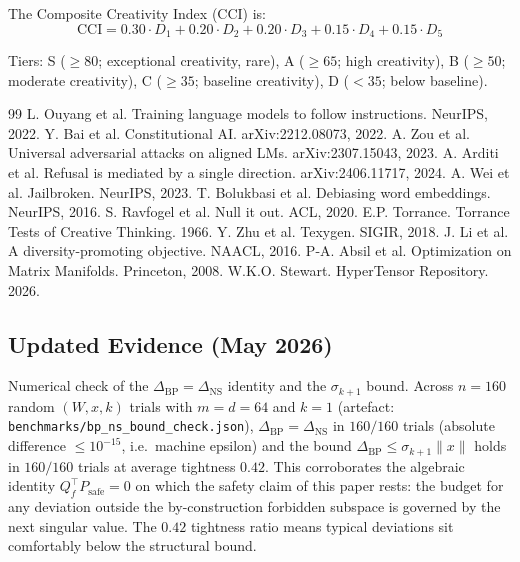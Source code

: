 \documentclass[11pt]{article}
\begin{document}
The Composite Creativity Index (CCI) is:
\begin{equation}
\mathrm{CCI} = 0.30 \cdot D_1 + 0.20 \cdot D_2 + 0.20 \cdot D_3 + 0.15 \cdot D_4 + 0.15 \cdot D_5
\end{equation}

Tiers: S ($\ge 80$; exceptional creativity, rare), A ($\ge 65$; high creativity), B ($\ge 50$; moderate creativity), C ($\ge 35$; baseline creativity), D ($<35$; below baseline).

\clearpage
\begin{thebibliography}{99}
 L. Ouyang et al. Training language models to follow instructions. NeurIPS, 2022.
 Y. Bai et al. Constitutional AI. arXiv:2212.08073, 2022.
 A. Zou et al. Universal adversarial attacks on aligned LMs. arXiv:2307.15043, 2023.
 A. Arditi et al. Refusal is mediated by a single direction. arXiv:2406.11717, 2024.
 A. Wei et al. Jailbroken. NeurIPS, 2023.
 T. Bolukbasi et al. Debiasing word embeddings. NeurIPS, 2016.
 S. Ravfogel et al. Null it out. ACL, 2020.
 E.P. Torrance. Torrance Tests of Creative Thinking. 1966.
 Y. Zhu et al. Texygen. SIGIR, 2018.
 J. Li et al. A diversity-promoting objective. NAACL, 2016.
 P-A. Absil et al. Optimization on Matrix Manifolds. Princeton, 2008.
 W.K.O. Stewart. HyperTensor Repository. 2026.
\end{thebibliography}

\subsection{Updated Evidence (May 2026)}
Numerical check of the $\Delta_{\mathrm{BP}} = \Delta_{\mathrm{NS}}$
identity and the $\sigma_{k+1}$ bound.
Across $n{=}160$ random $(W, x, k)$ trials with $m{=}d{=}64$ and $k{=}1$
(artefact: \texttt{benchmarks/bp\_ns\_bound\_check.json}),
$\Delta_{\mathrm{BP}} = \Delta_{\mathrm{NS}}$ in $160/160$ trials
(absolute difference $\le 10^{-15}$, i.e.\ machine epsilon) and the
bound $\Delta_{\mathrm{BP}} \le \sigma_{k+1}\|x\|$ holds in $160/160$
trials at average tightness $0.42$.  This corroborates the algebraic
identity
$Q_f^\top P_{\mathrm{safe}} = 0$ on which the safety claim of this paper
rests: the budget for any deviation outside the by-construction
forbidden subspace is governed by the next singular value.  The $0.42$
tightness ratio means typical deviations sit comfortably below the
structural bound.
\end{document}
